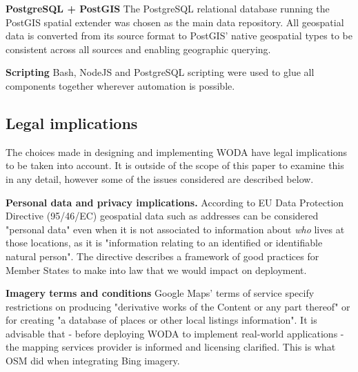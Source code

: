 \textbf{PostgreSQL + PostGIS} The PostgreSQL relational database running the PostGIS spatial extender was chosen as the main data repository. All geospatial data is converted from its source format to PostGIS' native geospatial types to be consistent across all sources and enabling geographic querying. 

\textbf{Scripting} Bash, NodeJS and PostgreSQL scripting were used to glue all components together wherever automation is possible.  

\subsection{Legal implications}

The choices made in designing and implementing WODA have legal implications to be taken into account. It is outside of the scope of this paper to examine this in any detail, however some of the issues considered are described below.

\textbf{Personal data and privacy implications.} According to EU Data Protection Directive (95/46/EC) geospatial data such as addresses can be considered "personal data" even when it is not associated to information about {\it who} lives at those locations, as it is "information relating to an identified or identifiable natural person". The directive describes a framework of good practices for Member States to make into law that we would impact on deployment.
	
\textbf{Imagery terms and conditions} Google Maps' terms of service specify restrictions on producing "derivative works of the Content or any part thereof" or for creating "a database of places or other local listings information". It is advisable that - before deploying WODA to implement real-world applications - the mapping services provider is informed and licensing clarified. This is what OSM did when integrating Bing imagery.
